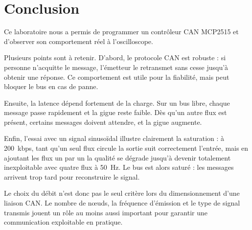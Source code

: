 \section{Conclusion}

Ce laboratoire nous a permis de programmer un contrôleur CAN MCP2515 et
d'observer son comportement réel à l'oscilloscope.

Plusieurs points sont à retenir. D'abord, le protocole CAN est robuste :
si personne n'acquitte le message, l'émetteur le retransmet sans cesse
jusqu'à obtenir une réponse. Ce comportement est utile pour la fiabilité,
mais peut bloquer le bus en cas de panne.

Ensuite, la latence dépend fortement de la charge. Sur un bus libre,
chaque message passe rapidement et la gigue reste faible. Dès qu'un autre
flux est présent, certains messages doivent attendre, et la
gigue augmente.

Enfin, l'essai avec un signal sinusoïdal illustre clairement la
saturation : à \num{200}~kbps, tant qu'un seul flux circule la sortie
suit correctement l'entrée, mais en ajoutant les flux un par un la qualité
se dégrade jusqu'à devenir totalement inexploitable avec quatre flux à
\num{50}~Hz. Le bus est alors saturé : les messages arrivent trop tard
pour reconstruire le signal.

Le choix du débit n'est donc pas le seul critère lors du dimensionnement
d'une liaison CAN. Le nombre de nœuds, la fréquence d'émission et le
type de signal transmis jouent un rôle au moins aussi important pour
garantir une communication exploitable en pratique.
